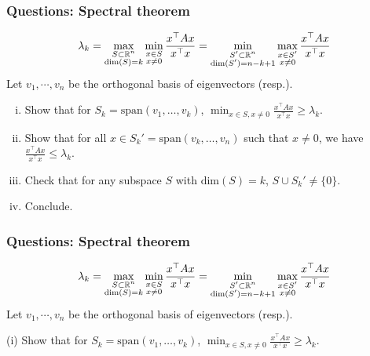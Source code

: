 \documentclass{beamer}
\begin{document}
\begin{frame}[t]
\frametitle{Questions: Spectral theorem}
\vspace{-10pt}
\begin{align*}
\lambda_k = \max_{\substack{S \subset \mathbb{R}^n \\ \text{dim}(S) = k}} \min_{\substack{x \in S \\ x \neq 0}} \frac{x^\top A x}{x^\top x} = \min_{\substack{S' \subset \mathbb{R}^n \\ \text{dim}(S') = n-k+1}} \max_{\substack{x \in S' \\ x \neq 0}} \frac{x^\top A x}{x^\top x}
\end{align*}
Let $v_1, \cdots, v_n$ be the orthogonal basis of eigenvectors (resp.).
\begin{enumerate}[(i)]
\item Show that for $S_k = \text{span}(v_1, \dots, v_k)$, $\min_{x \in S, x \neq 0} \frac{x^\top A x}{x^\top x} \geq \lambda_k$.
\item Show that for all $x \in S_k' = \text{span}(v_k, \dots, v_n)$ such that $x \neq 0$, we have  $\frac{x^\top A x}{x^\top x} \leq \lambda_k$.
\item Check that for any subspace $S$ with $\text{dim}(S) = k$, $S \cup S_k' \neq \{0\}$.
\item Conclude.
\end{enumerate}
\end{frame}

\begin{frame}[t]
\frametitle{Questions: Spectral theorem}
\vspace{-15pt}
\begin{align*}
\lambda_k = \max_{\substack{S \subset \mathbb{R}^n \\ \text{dim}(S) = k}} \min_{\substack{x \in S \\ x \neq 0}} \frac{x^\top A x}{x^\top x} = \min_{\substack{S' \subset \mathbb{R}^n \\ \text{dim}(S') = n-k+1}} \max_{\substack{x \in S' \\ x \neq 0}} \frac{x^\top A x}{x^\top x}
\end{align*}
Let $v_1, \cdots, v_n$ be the orthogonal basis of eigenvectors (resp.).

(i) Show that for $S_k = \text{span}(v_1, \dots, v_k)$, $\min_{x \in S, x \neq 0} \frac{x^\top A x}{x^\top x} \geq \lambda_k$.
\end{frame}
\end{document}
